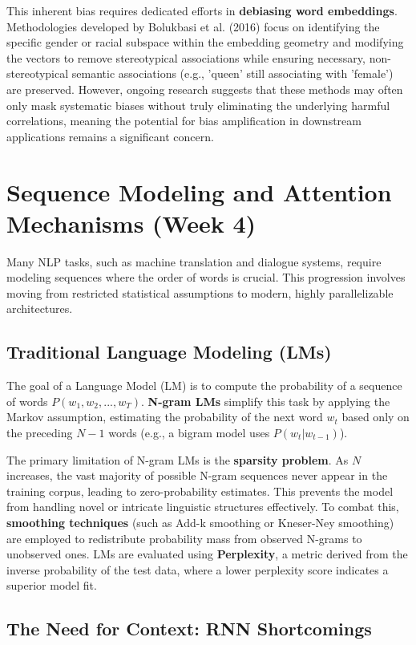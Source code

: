 \documentclass{article}
\begin{document}
This inherent bias requires dedicated efforts in \textbf{debiasing word embeddings}. Methodologies developed by Bolukbasi et al. (2016) focus on identifying the specific gender or racial subspace within the embedding geometry and modifying the vectors to remove stereotypical associations while ensuring necessary, non-stereotypical semantic associations (e.g., 'queen' still associating with 'female') are preserved. However, ongoing research suggests that these methods may often only mask systematic biases without truly eliminating the underlying harmful correlations, meaning the potential for bias amplification in downstream applications remains a significant concern.

\section{Sequence Modeling and Attention Mechanisms (Week 4)}

Many NLP tasks, such as machine translation and dialogue systems, require modeling sequences where the order of words is crucial. This progression involves moving from restricted statistical assumptions to modern, highly parallelizable architectures.

\subsection{Traditional Language Modeling (LMs)}

The goal of a Language Model (LM) is to compute the probability of a sequence of words $P(w_1, w_2,..., w_T)$. \textbf{N-gram LMs} simplify this task by applying the Markov assumption, estimating the probability of the next word $w_t$ based only on the preceding $N-1$ words (e.g., a bigram model uses $P(w_t|w_{t-1})$).

The primary limitation of N-gram LMs is the \textbf{sparsity problem}. As $N$ increases, the vast majority of possible N-gram sequences never appear in the training corpus, leading to zero-probability estimates. This prevents the model from handling novel or intricate linguistic structures effectively. To combat this, \textbf{smoothing techniques} (such as Add-k smoothing or Kneser-Ney smoothing) are employed to redistribute probability mass from observed N-grams to unobserved ones. LMs are evaluated using \textbf{Perplexity}, a metric derived from the inverse probability of the test data, where a lower perplexity score indicates a superior model fit.

\subsection{The Need for Context: RNN Shortcomings}
\end{document}
